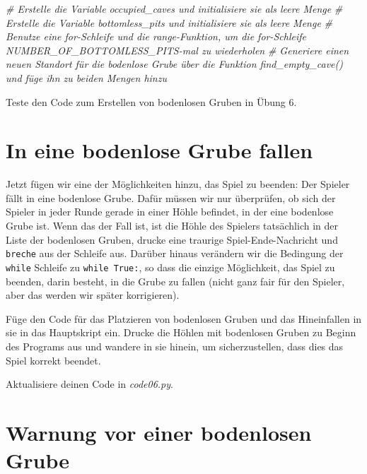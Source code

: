 \documentclass[
]{book}
\newenvironment{Shaded}{\begin{snugshade}}{\end{snugshade}}
\newcommand{\CommentTok}[1]{\textcolor[rgb]{0.56,0.35,0.01}{\textit{#1}}}
\begin{document}
\begin{Shaded}
\begin{Highlighting}[]
\CommentTok{\# Erstelle die Variable \textasciigrave{}occupied\_caves\textasciigrave{} und initialisiere sie als leere Menge}
\CommentTok{\# Erstelle die Variable \textasciigrave{}bottomless\_pits\textasciigrave{} und initialisiere sie als leere Menge}
\CommentTok{\# Benutze eine for{-}Schleife und die range{-}Funktion, um die for{-}Schleife NUMBER\_OF\_BOTTOMLESS\_PITS{-}mal zu wiederholen}
\CommentTok{\#     Generiere einen neuen Standort für die bodenlose Grube über die Funktion find\_empty\_cave() und füge ihn zu beiden Mengen hinzu}
\end{Highlighting}
\end{Shaded}

Teste den Code zum Erstellen von bodenlosen Gruben in Übung 6.

\hypertarget{in-eine-bodenlose-grube-fallen}{%
\section{In eine bodenlose Grube fallen}\label{in-eine-bodenlose-grube-fallen}}

Jetzt fügen wir eine der Möglichkeiten hinzu, das Spiel zu beenden: Der Spieler fällt in eine bodenlose Grube. Dafür müssen wir nur überprüfen, ob sich der Spieler in jeder Runde gerade in einer Höhle befindet, in der eine bodenlose Grube ist. Wenn das der Fall ist, ist die Höhle des Spielers tatsächlich in der Liste der bodenlosen Gruben, drucke eine traurige Spiel-Ende-Nachricht und \texttt{breche} aus der Schleife aus. Darüber hinaus verändern wir die Bedingung der \texttt{while} Schleife zu \texttt{while\ True:}, so dass die einzige Möglichkeit, das Spiel zu beenden, darin besteht, in die Grube zu fallen (nicht ganz fair für den Spieler, aber das werden wir später korrigieren).

Füge den Code für das Platzieren von bodenlosen Gruben und das Hineinfallen in sie in das Hauptskript ein. Drucke die Höhlen mit bodenlosen Gruben zu Beginn des Programs aus und wandere in sie hinein, um sicherzustellen, dass dies das Spiel korrekt beendet.

Aktualisiere deinen Code in \emph{code06.py}.

\hypertarget{warnung-vor-einer-bodenlosen-grube}{%
\section{Warnung vor einer bodenlosen Grube}\label{warnung-vor-einer-bodenlosen-grube}}
\end{document}
